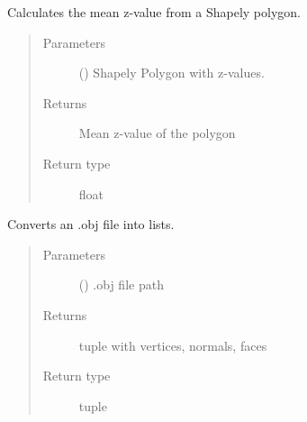 \documentclass[letterpaper,10pt,english]{sphinxmanual}
\begin{document}
\begin{fulllineitems}
\label{\detokenize{geometry:livestock.geometry.centroid_z}}
Calculates the mean z-value from a Shapely polygon.
\begin{quote}\begin{description}
\item[{Parameters}] \leavevmode
{} () \textendash{} Shapely Polygon with z-values.

\item[{Returns}] \leavevmode
Mean z-value of the polygon

\item[{Return type}] \leavevmode
float

\end{description}\end{quote}

\end{fulllineitems}


\begin{fulllineitems}
\label{\detokenize{geometry:livestock.geometry.obj_to_lists}}
Converts an .obj file into lists.
\begin{quote}\begin{description}
\item[{Parameters}] \leavevmode
{} () \textendash{} .obj file path

\item[{Returns}] \leavevmode
tuple with vertices, normals, faces

\item[{Return type}] \leavevmode
tuple

\end{description}\end{quote}

\end{fulllineitems}

\end{document}
